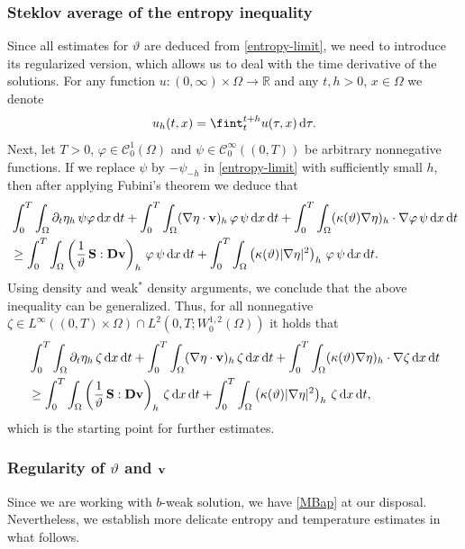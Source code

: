 \documentclass[11pt, a4paper, reqno]{amsart}
\numberwithin{equation}{section}
\newcommand{\dert}{\partial_t}
\newcommand{\vc}[1]{{\bf #1}}
\newcommand{\vv}{\vc{v}}
\newcommand{\thet}{\vartheta}
\renewcommand{\S}{\mathbf{S}}
\newcommand{\D}{\mathbf{D}}
\newcommand{\dt}{\,{\rm d} t }
\newcommand{\dx}{\,{\rm d} {x}}
\newcommand{\dxdt}{\dx  \dt}
\newcommand{\intO}[1]{\int_{\Omega} #1 \dx}
\newcommand{\intTO}[1]{\int_0^T \int_{\Omega} #1  \dxdt}
\newcommand{\bb}{b}
\newcommand{\bws}{$\bb$-weak solution}
\begin{document}
\subsubsection{Steklov average of the entropy inequality}
Since all estimates for $\thet$ are deduced from \eqref{entropy-limit}, we need to introduce its regularized version, which allows us to deal with the time derivative of the solutions. For any function $u:(0,\infty)\times \Omega \to \mathbb{R}$ and any $t, h>0$, $x\in\Omega$ we denote
$$
 u_h(t, x) = \fint_t^{t+h} u(\tau, x) \,{\rm d}\tau.
$$
Next, let $T>0$, $\varphi \in \mathcal{C}^1_0(\Omega)$ and $\psi \in \mathcal{C}_0^{\infty}((0,T))$ be arbitrary nonnegative functions.  
If we replace $\psi$ by $-\psi_{-h}$ in \eqref{entropy-limit} with sufficiently small $h$, 
then after applying Fubini’s theorem we deduce that
\begin{equation*}%
\begin{split}
&\intTO{\dert\eta_h\,\psi \varphi} + \intTO{(\nabla\eta\cdot \vv)_h \, \varphi \,\psi}  + \intTO{(\kappa(\thet)\nabla\eta)_h \cdot\nabla \varphi \, \psi}
\\
& \geq \intTO{\left(\frac{1}{\thet}\,\S:\D{\vv}\right)_h\, \varphi \, \psi} + \intTO{\left(\kappa(\thet)|\nabla\eta|^2\right)_h\,\varphi\, \psi}.%
\end{split}
\end{equation*}
Using density and weak$^*$ density arguments, we conclude that the above inequality can be generalized.  
Thus, for all nonnegative $\zeta \in L^\infty((0,T)\times\Omega)\cap L^2(0,T;W^{1,2}_0(\Omega))$ it holds that
\begin{equation}\label{entropy-limit2}
\begin{split}
&\intTO{\dert\eta_h\,\zeta} + \intTO{(\nabla\eta\cdot \vv)_h \, \zeta}  + \intTO{(\kappa(\thet)\nabla\eta)_h \cdot\nabla \zeta}
\\
& \geq \intTO{\left(\frac{1}{\thet}\,\S:\D{\vv}\right)_h\, \zeta} + \intTO{\left(\kappa(\thet)|\nabla\eta|^2\right)_h\,\zeta},
\end{split}
\end{equation}
which is the starting point for further estimates.

\subsubsection{Regularity of $\thet$ and $\vv$}\label{sss:regthetv} Since we are working with \bws, we have \eqref{MBap} at our disposal.  
Nevertheless, we establish more delicate entropy and temperature estimates in what follows. 
\end{document}
